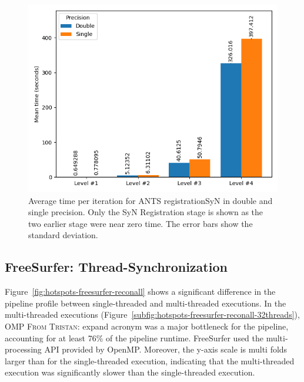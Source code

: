 \documentclass[conference]{IEEEtran}
\newcommand{\TG}[1]{\color{blue}\textsc{From Tristan: }#1\color{black}}
\begin{document}
\begin{figure}
	\includegraphics[width=\linewidth]{figures/ants-registrationSyN-iteration-mean.png}
	\caption{Average time per iteration for ANTS registrationSyN in double and single precision. Only the SyN Registration stage is shown as the two earlier stage were near zero time. The error bars show the standard deviation.}
	\label{fig:mean-time-per-iteration-ants}
\end{figure}
						
\subsection{FreeSurfer: Thread-Synchronization}
Figure~\ref{fig:hotspots-freesurfer-reconall} shows a significant difference in the pipeline profile between single-threaded and multi-threaded executions. In the multi-threaded executions (Figure~\ref{subfig:hotspots-freesurfer-reconall-32threads}), OMP \TG{expand acronym} was a major bottleneck for the pipeline, accounting for at least 76\% of the pipeline runtime. FreeSurfer used the multi-processing API provided by OpenMP. Moreover, the y-axis scale is multi folds larger than for the single-threaded execution, indicating that the multi-threaded execution was significantly slower than the single-threaded execution.
					
\end{document}
